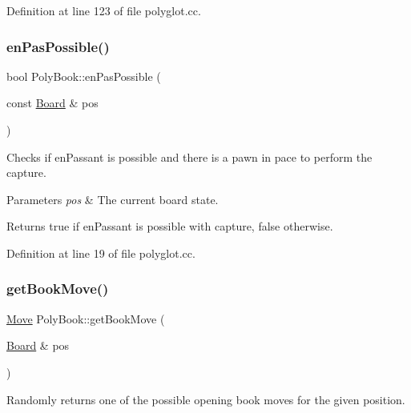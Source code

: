 Definition at line 123 of file polyglot.\+cc.

\mbox{\label{classPolyBook_a41fe4efcd8f8711183a1fe09753659c7}} 
\subsubsection{\texorpdfstring{en\+Pas\+Possible()}{enPasPossible()}}
{\footnotesize\ttfamily bool Poly\+Book\+::en\+Pas\+Possible (\begin{DoxyParamCaption}\item[{const \mbox{\hyperlink{classBoard}{Board}} \&}]{pos }\end{DoxyParamCaption})\hspace{0.3cm}{\ttfamily [private]}}



Checks if en\+Passant is possible and there is a pawn in pace to perform the capture. 


\begin{DoxyParams}{Parameters}
{\em pos} & The current board state. \\
\hline
\end{DoxyParams}
\begin{DoxyReturn}{Returns}
true if en\+Passant is possible with capture, false otherwise. 
\end{DoxyReturn}


Definition at line 19 of file polyglot.\+cc.

\mbox{\label{classPolyBook_a594d060bcb84f4d6cd3999ca4698f847}} 
\subsubsection{\texorpdfstring{get\+Book\+Move()}{getBookMove()}}
{\footnotesize\ttfamily \mbox{\hyperlink{classMove}{Move}} Poly\+Book\+::get\+Book\+Move (\begin{DoxyParamCaption}\item[{\mbox{\hyperlink{classBoard}{Board}} \&}]{pos }\end{DoxyParamCaption})}



Randomly returns one of the possible opening book moves for the given position. 


